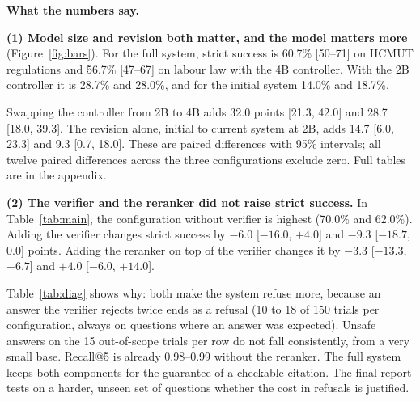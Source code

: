 \documentclass[a4paper,11pt]{article}
\newcommand{\hdr}[1]{\par\vspace{1.5pt}\noindent\textbf{#1}}
\begin{document}
\hdr{What the numbers say.}\par\noindent\textbf{(1) Model size and revision both matter, and the model matters more} (Figure~\ref{fig:bars}). For the full system, strict success is 60.7\% [50--71] on HCMUT regulations and 56.7\% [47--67] on labour law with the 4B controller. With the 2B controller it is 28.7\% and 28.0\%, and for the initial system 14.0\% and 18.7\%.

Swapping the controller from 2B to 4B adds 32.0 points [21.3, 42.0] and 28.7 [18.0, 39.3]. The revision alone, initial to current system at 2B, adds 14.7 [6.0, 23.3] and 9.3 [0.7, 18.0]. These are paired differences with 95\% intervals; all twelve paired differences across the three configurations exclude zero. Full tables are in the appendix.

\par\noindent\textbf{(2) The verifier and the reranker did not raise strict success.} In Table~\ref{tab:main}, the configuration without verifier is highest (70.0\% and 62.0\%). Adding the verifier changes strict success by $-6.0$ [$-16.0$, $+4.0$] and $-9.3$ [$-18.7$, $0.0$] points. Adding the reranker on top of the verifier changes it by $-3.3$ [$-13.3$, $+6.7$] and $+4.0$ [$-6.0$, $+14.0$].

Table~\ref{tab:diag} shows why: both make the system refuse more, because an answer the verifier rejects twice ends as a refusal (10 to 18 of 150 trials per configuration, always on questions where an answer was expected). Unsafe answers on the 15 out-of-scope trials per row do not fall consistently, from a very small base. Recall@5 is already 0.98--0.99 without the reranker. The full system keeps both components for the guarantee of a checkable citation. The final report tests on a harder, unseen set of questions whether the cost in refusals is justified.
\end{document}
